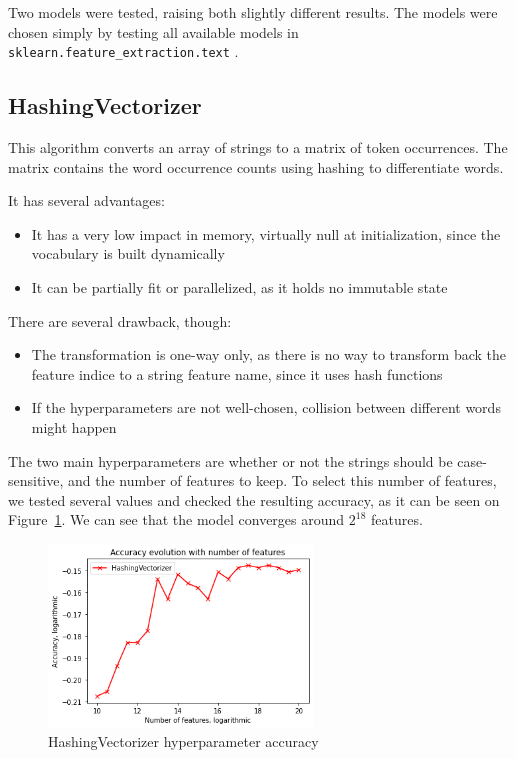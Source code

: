 \documentclass[11pt]{article}
\begin{document}
Two models were tested, raising both slightly different results.
The models were chosen simply by testing all available models in \texttt{sklearn.feature\_extraction.text} . 

\subsection{HashingVectorizer}

This algorithm converts an array of strings to a matrix of token occurrences.
The matrix contains the word occurrence counts using hashing to differentiate words.

It has several advantages:
\begin{itemize}
\item It has a very low impact in memory, virtually null at initialization,
since the vocabulary is built dynamically
\item It can be partially fit or parallelized, as it holds no immutable state
\end{itemize}

There are several drawback, though:
\begin{itemize}
\item The transformation is one-way only, as there is no way to transform back the feature indice
to a string feature name, since it uses hash functions
\item If the hyperparameters are not well-chosen, collision between different words might happen
\end{itemize}

The two main hyperparameters are whether or not the strings should be case-sensitive,
and the number of features to keep.
To select this number of features, we tested several values and checked the resulting accuracy,
as it can be seen on Figure~\ref{fig:hash_accuracy}. We can see that the model converges
around $2^{18}$ features.

\begin{figure}[htb]
\begin{center}
\includegraphics[width=70mm]{data/n_features_hash.png}
\end{center}
\caption{HashingVectorizer hyperparameter accuracy}
\label{fig:hash_accuracy}
\end{figure}
\end{document}
